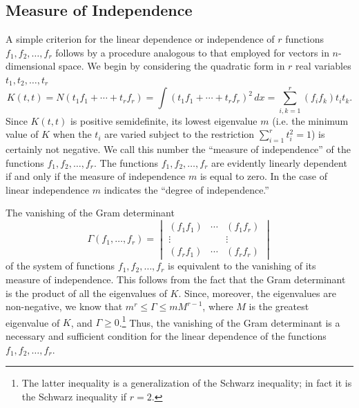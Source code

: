 \subsection{Measure of Independence}
A simple criterion for the linear dependence or independence of $r$ functions $f_1,f_2,\ldots,f_r$ follows by a procedure analogous to that employed for vectors in $n$-dimensional space. We begin by considering the quadratic form in $r$ real variables $t_1,t_2,\ldots,t_r$
\begin{equation}
K(t,t)=N(t_1f_1+\cdots+t_rf_r)=\int(t_1f_1+\cdots+t_rf_r)^2\,dx
=\sum_{i,k=1}^{r}(f_if_k)t_it_k.
\tag{12}
\end{equation}
Since $K(t,t)$ is positive semidefinite, its lowest eigenvalue $m$ (i.e. the minimum value of $K$ when the $t_i$ are varied subject to the restriction $\sum_{i=1}^{r}t_i^2=1$) is certainly not negative. We call this number the ``measure of independence'' of the functions $f_1,f_2,\ldots,f_r$. The functions $f_1,f_2,\ldots,f_r$ are evidently linearly dependent if and only if the measure of independence $m$ is equal to zero. In the case of linear independence $m$ indicates the ``degree of independence.''

The vanishing of the Gram determinant
\begin{equation}
\Gamma(f_1,\ldots,f_r)=
\begin{vmatrix}
(f_1f_1)&\cdots&(f_1f_r)\\
\vdots&&\vdots\\
(f_rf_1)&\cdots&(f_rf_r)
\end{vmatrix}
\tag{13}
\end{equation}
of the system of functions $f_1,f_2,\ldots,f_r$ is equivalent to the vanishing of its measure of independence. This follows from the fact that the Gram determinant is the product of all the eigenvalues of $K$. Since, moreover, the eigenvalues are non-negative, we know that $m^r\le\Gamma\le mM^{r-1}$, where $M$ is the greatest eigenvalue of $K$, and $\Gamma\ge0$.\footnote{The latter inequality is a generalization of the Schwarz inequality; in fact it is the Schwarz inequality if $r=2$.} Thus, the vanishing of the Gram determinant is a necessary and sufficient condition for the linear dependence of the functions $f_1,f_2,\ldots,f_r$.

